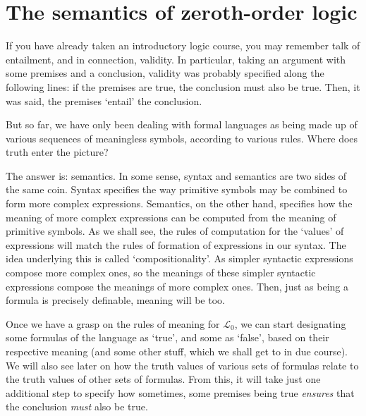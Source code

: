 \chapter{The semantics of zeroth-order logic}

If you have already taken an introductory logic course, you may remember talk of entailment, and in connection, validity. In particular, taking an argument with some premises and a conclusion, validity was probably specified along the following lines: if the premises are true, the conclusion must also be true. Then, it was said, the premises `entail' the conclusion. 

But so far, we have only been dealing with formal languages as being made up of various sequences of meaningless symbols, according to various rules. Where does truth enter the picture? 

The answer is: semantics. In some sense, syntax and semantics are two sides of the same coin. Syntax specifies the way primitive symbols may be combined to form more complex expressions. Semantics, on the other hand, specifies how the meaning of more complex expressions can be computed from the meaning of primitive symbols. As we shall see, the rules of computation for the `values' of expressions will match the rules of formation of expressions in our syntax. The idea underlying this is called `compositionality'. As simpler syntactic expressions compose more complex ones, so the meanings of these simpler syntactic expressions compose the meanings of more complex ones. Then, just as being a formula is precisely definable, meaning will be too. 

Once we have a grasp on the rules of meaning for $\mathcal{L}_0$, we can start designating some formulas of the language as `true', and some as `false', based on their respective meaning (and some other stuff, which we shall get to in due course). We will also see later on how the truth values of various sets of formulas relate to the truth values of other sets of formulas. From this, it will take just one additional step to specify how sometimes, some premises being true \textit{ensures} that the conclusion \textit{must} also be true. 


